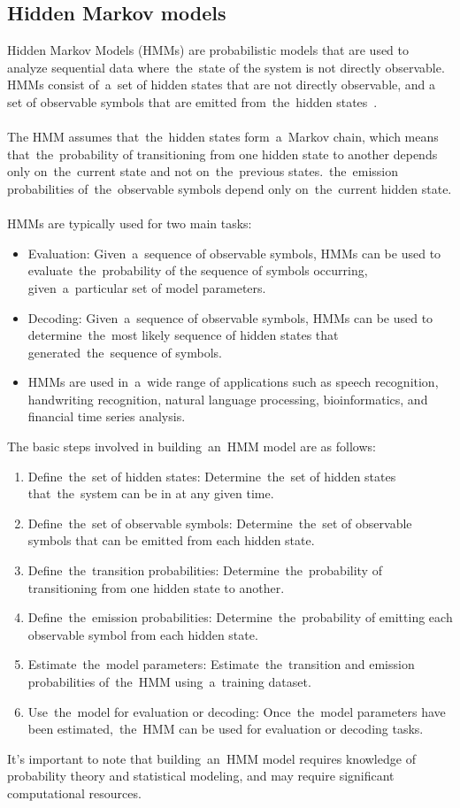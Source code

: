 \subsection{Hidden Markov models}\label{subsec:hmm}
Hidden Markov Models (HMMs) are probabilistic models that are used to analyze sequential data where~the~state of the
system is not directly observable. HMMs consist of~a~set of hidden states that are not directly observable, and a
set of observable symbols that are emitted from~the~hidden states~\cite{math10081230}.\\
\\
The HMM assumes that~the~hidden states form~a~Markov chain, which means that~the~probability of transitioning from
one hidden state to another depends only on~the~current state and not on~the~previous states.~the~emission
probabilities of~the~observable symbols depend only on~the~current hidden state.\\
\\
HMMs are typically used for two main tasks:
\begin{itemize}
    \item Evaluation: Given~a~sequence of observable symbols, HMMs can be used to evaluate~the~probability of the
    sequence of symbols occurring, given~a~particular set of model parameters.
    \item Decoding: Given~a~sequence of observable symbols, HMMs can be used to determine~the~most likely
    sequence of hidden states that generated~the~sequence of symbols.
    \item HMMs are used in~a~wide range of applications such as speech recognition, handwriting recognition, natural
    language processing, bioinformatics, and financial time series analysis.
\end{itemize}
The basic steps involved in building~an~HMM model are as follows:
\begin{enumerate}
    \item Define~the~set of hidden states: Determine~the~set of hidden states that~the~system can be in at any given time.
    \item Define~the~set of observable symbols: Determine~the~set of observable symbols that can be emitted from each hidden state.
    \item Define~the~transition probabilities: Determine~the~probability of transitioning from one hidden state to another.
    \item Define~the~emission probabilities: Determine~the~probability of emitting each observable symbol from each hidden state.
    \item Estimate~the~model parameters: Estimate~the~transition and emission probabilities of~the~HMM using~a~training dataset.
    \item Use~the~model for evaluation or decoding: Once~the~model parameters have been estimated,~the~HMM
    can be used for evaluation or decoding tasks.
\end{enumerate}
It's important to note that building~an~HMM model requires knowledge of probability theory and statistical
modeling, and may require significant computational resources.



